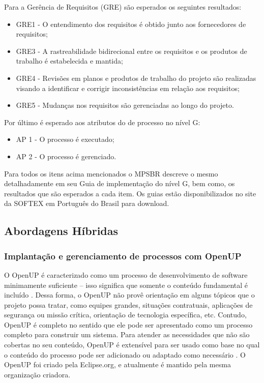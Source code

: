 \documentclass{acm_proc_article-sp}
\begin{document}
Para a Gerência de Requisitos (GRE) são esperados os seguintes resultados:
\begin{itemize}
\item GRE1 - O entendimento dos requisitos é obtido junto aos fornecedores de requisitos;
\item GRE3 - A rastreabilidade bidirecional entre os requisitos e os produtos de trabalho é estabelecida e mantida;
\item GRE4 - Revisões em planos e produtos de trabalho do projeto são realizadas visando a identificar e corrigir inconsistências em relação aos requisitos;
\item GRE5 - Mudanças nos requisitos são gerenciadas ao longo do projeto.
\end{itemize}

Por último é esperado aos atributos do de processo no nível G:
\begin{itemize}
\item AP 1 - O processo é executado;
\item AP 2 - O processo é gerenciado.
\end{itemize}

Para todos os itens acima mencionados o MPSBR \cite{mpsbr:nAgil} descreve o mesmo detalhadamente em seu Guia de implementação do nível G, bem como, os resultados que são esperados a cada item. Os guias estão disponibilizados no site da SOFTEX em Português do Brasil para download.


\subsection{Abordagens Híbridas}

\subsubsection{Implantação e gerenciamento de processos com OpenUP}
O OpenUP é caracterizado como um processo de desenvolvimento de software minimamente suficiente – isso
significa que somente o conteúdo fundamental é incluído \cite{openUP:agil}. Dessa forma, o OpenUP não provê orientação em
alguns tópicos que o projeto possa tratar, como equipes grandes, situações contratuais, aplicações de segurança ou missão crítica, orientação de tecnologia específica, etc. Contudo, OpenUP é completo no sentido que ele pode ser apresentado como um processo completo para construir um sistema. Para atender as necessidades que não são cobertas no seu conteúdo, OpenUP é extensível para ser usado como base no qual o conteúdo do processo pode ser adicionado ou adaptado como necessário \cite{openUP:agil}. O OpenUP foi criado pela Eclipse.org, e atualmente é mantido pela mesma organização criadora.
\end{document}
